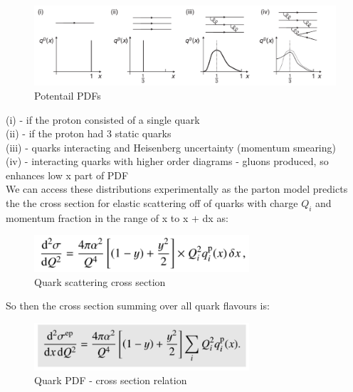         \begin{figure}[H]
            \centering
            \includegraphics[width=12cm]{NuclearPhysics/modules/lepton-scattering/pics/inelastic-ep/pdf-possibilities.PNG}
            \caption{Potentail PDFs}
        \end{figure}
        
        (i) - if the proton consisted of a single quark\\
        (ii) - if the proton had 3 static quarks\\
        (iii) - quarks interacting and Heisenberg uncertainty (momentum smearing)\\
        (iv) - interacting quarks with higher order diagrams - gluons produced, so enhances low x part of PDF\\
        \newline
        We can access these distributions experimentally as the parton model predicts the the cross section for elastic scattering off of quarks with charge $Q_i$ and momentum fraction in the range of x to x + dx as:
        
               
        \begin{figure}[H]
            \centering
            \includegraphics[width=8cm]{NuclearPhysics/modules/lepton-scattering/pics/inelastic-ep/quark-x.PNG}
            \caption{Quark scattering cross section}
        \end{figure}
        
        So then the cross section summing over all quark flavours is:
        
               
        \begin{figure}[H]
            \centering
            \includegraphics[width=8cm]{NuclearPhysics/modules/lepton-scattering/pics/inelastic-ep/quark-x-sum.PNG}
            \caption{Quark PDF - cross section relation}
        \end{figure}
        
